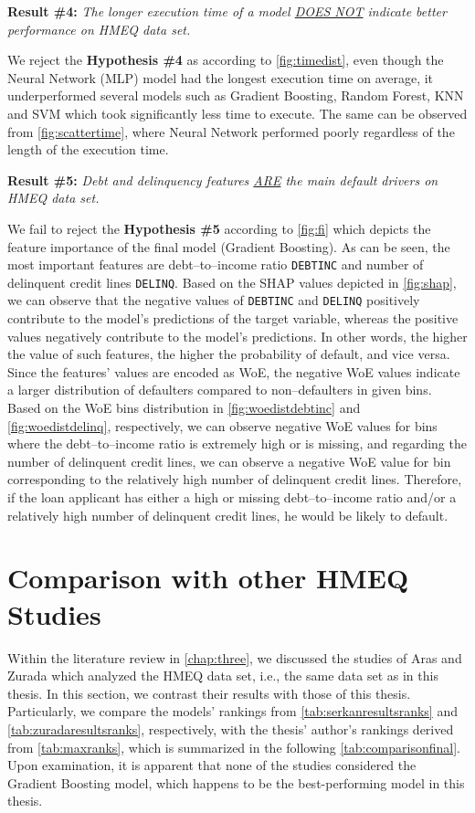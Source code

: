 \noindent \textbf{Result \#4:} \textit{The longer execution time of a model \underline{DOES NOT} indicate better performance on HMEQ data set.}

We reject the \textbf{Hypothesis \#4} as according to \autoref{fig:timedist}, even though the Neural Network (MLP) model had the longest execution time on average, it underperformed several models such as Gradient Boosting, Random Forest, KNN and SVM which took significantly less time to execute. The same can be observed from \autoref{fig:scattertime}, where Neural Network performed poorly regardless of the length of the execution time.
\vspace{0.3cm}

\newpage
\noindent \textbf{Result \#5:} \textit{Debt and delinquency features \underline{ARE} the main default drivers on HMEQ data set.}

We fail to reject the \textbf{Hypothesis \#5} according to \autoref{fig:fi} which depicts the feature importance of the final model (Gradient Boosting). As can be seen, the most important features are debt--to--income ratio \texttt{DEBTINC} and number of delinquent credit lines \texttt{DELINQ}.
Based on the SHAP values depicted in \autoref{fig:shap}, we can observe that the negative values of \texttt{DEBTINC} and \texttt{DELINQ} positively contribute to the model's predictions of the target variable, whereas the positive values negatively contribute to the model's predictions.
In other words, the higher the value of such features, the higher the probability of default, and vice versa.
Since the features' values are encoded as WoE, the negative WoE values indicate a larger distribution of defaulters compared to non--defaulters in given bins.
Based on the WoE bins distribution in \autoref{fig:woedistdebtinc} and \autoref{fig:woedistdelinq}, respectively, we can observe negative WoE values for bins where the debt--to--income ratio is extremely high or is missing, and regarding the number of delinquent credit lines, we can observe a negative WoE value for bin corresponding to the relatively high number of delinquent credit lines.
Therefore, if the loan applicant has either a high or missing debt--to--income ratio and/or a relatively high number of delinquent credit lines, he would be likely to default.

\newpage
\section{Comparison with other HMEQ Studies}
\label{sec:comparisonfinal}
Within the literature review in \autoref{chap:three}, we discussed the studies of Aras \citep{serkan2021bagging} and Zurada \citep{zurada2014classification} which analyzed the HMEQ data set, i.e., the same data set as in this thesis.
In this section, we contrast their results with those of this thesis. Particularly, we compare the models' rankings from \autoref{tab:serkanresultsranks} and \autoref{tab:zuradaresultsranks}, respectively, with the thesis' author's rankings derived from \autoref{tab:maxranks}, which is summarized in the following \autoref{tab:comparisonfinal}.
Upon examination, it is apparent that none of the studies considered the Gradient Boosting model, which happens to be the best-performing model in this thesis.

